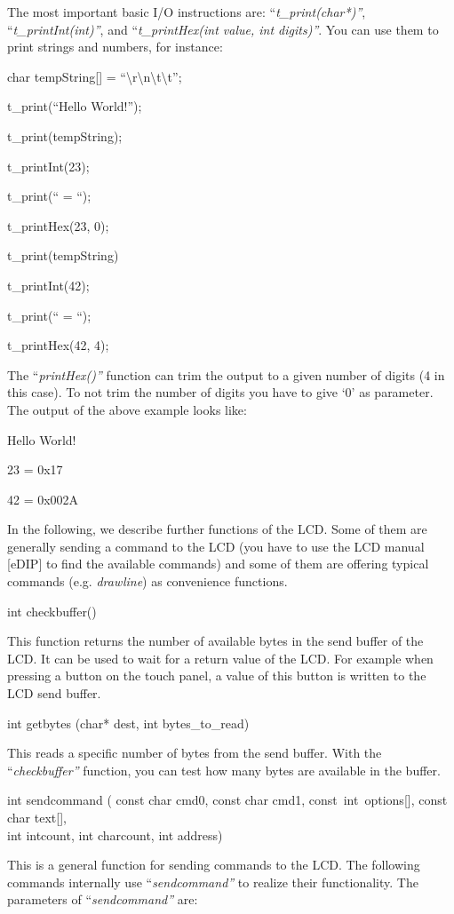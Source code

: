 \documentclass[
]{article}
\begin{document}
The most important basic I/O instructions are:
``\emph{t\_print(char*)''}, ``\emph{t\_printInt(int)''}, and
``\emph{t\_printHex(int value, int digits)''}. You can use them to print
strings and numbers, for instance:

char tempString{[}{]} =
``\textbackslash r\textbackslash n\textbackslash t\textbackslash t'';

t\_print(``Hello World!'');

t\_print(tempString);

t\_printInt(23);

t\_print(`` = ``);

t\_printHex(23, 0);

t\_print(tempString)

t\_printInt(42);

t\_print(`` = ``);

t\_printHex(42, 4);

The ``\emph{printHex()''} function can trim the output to a given number
of digits (4 in this case). To not trim the number of digits you have to
give `0' as parameter. The output of the above example looks like:

Hello World!

23 = 0x17

42 = 0x002A

In the following, we describe further functions of the LCD. Some of them
are generally sending a command to the LCD (you have to use the LCD
manual {[}eDIP{]} to find the available commands) and some of them are
offering typical commands (e.g. \emph{drawline}) as convenience
functions.

int checkbuffer()

This function returns the number of available bytes in the send buffer
of the LCD. It can be used to wait for a return value of the LCD. For
example when pressing a button on the touch panel, a value of this
button is written to the LCD send buffer.

int getbytes (char* dest, int bytes\_to\_read)

This reads a specific number of bytes from the send buffer. With the
``\emph{checkbuffer''} function, you can test how many bytes are
available in the buffer.

int sendcommand ( const char cmd0, const char cmd1,
const~int~options{[}{]}, const char text{[}{]},\\
int intcount, int charcount, int address)

This is a general function for sending commands to the LCD. The
following commands internally use ``\emph{sendcommand''} to realize
their functionality. The parameters of ``\emph{sendcommand''} are:
\end{document}

